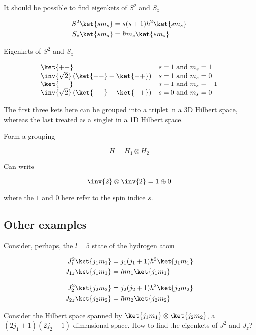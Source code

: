It should be possible to find eigenkets of $S^2$ and $S_z$

\begin{align}\label{eqn:qmTwoL16:n}
S^2 \ket{s m_s} &= s(s+1)\hbar^2 \ket{s m_s} \\
S_z \ket{s m_s} &= \hbar m_s \ket{s m_s} 
\end{align}

Eigenkets of $S^2$ and $S_z$

\begin{equation}\label{eqn:qmTwoL16:n}
\begin{array}{l l}
\ket{++} 
& \mbox{$s = 1$ and $m_s = 1$} \\
\inv{\sqrt{2}} \left( \ket{+-} + \ket{-+} \right) 
& \mbox{$s = 1$ and $m_s = 0$} \\
\ket{--} 
& \mbox{$s = 1$ and $m_s = -1$} \\
\inv{\sqrt{2}} \left( \ket{+-} - \ket{-+} \right) 
& \mbox{$s = 0$ and $m_s = 0$}
\end{array}
\end{equation}

The first three kets here can be grouped into a triplet in a 3D Hilbert space, whereas the last treated as a singlet in a 1D Hilbert space.

Form a grouping

\begin{equation}\label{eqn:qmTwoL16:n}
H = H_1 \otimes H_2
\end{equation}

Can write

\begin{equation}\label{eqn:qmTwoL16:n}
\inv{2} \otimes \inv{2} = 1 \oplus 0
\end{equation}

where the $1$ and $0$ here refer to the spin indice $s$.

\subsection{Other examples}

Consider, perhaps, the $l=5$ state of the hydrogen atom

\begin{align}\label{eqn:qmTwoL16:n}
J_1^2 \ket{j_1 m_1} &= j_1(j_1+1)\hbar^2 \ket{j_1 m_1} \\
J_{1z} \ket{j_1 m_1} &= \hbar m_1 \ket{j_1 m_1} 
\end{align}

\begin{align}\label{eqn:qmTwoL16:n}
J_2^2 \ket{j_2 m_2} &= j_2(j_2+1)\hbar^2 \ket{j_2 m_2} \\
J_{2z} \ket{j_2 m_2} &= \hbar m_2 \ket{j_2 m_2} 
\end{align}

Consider the Hilbert space spanned by $\ket{j_1 m_1} \otimes \ket{j_2 m_2}$, a $(2 j_1 + 1)(2 j_2 + 1)$ dimensional space.  How to find the eigenkets of $J^2$ and $J_z$?

\EndArticle
